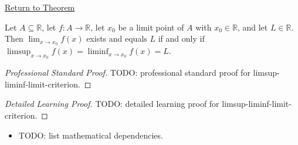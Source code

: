 \newpage
{}
\label{prf:limsup-liminf-limit-criterion}

\begin{remark*}[Return]
\hyperref[prop:limsup-liminf-limit-criterion]{Return to Theorem}
\end{remark*}

\begin{theorem*}[Limit Exists iff $=$]
Let $A \subseteq \mathbb{R}$, let $f \colon A \to \mathbb{R}$, let $x_0$ be a limit point of $A$ with $x_0 \in \mathbb{R}$, and let $L \in \mathbb{R}$. Then $\lim_{x \to x_0} f(x)$ exists and equals $L$ if and only if $\limsup_{x \to x_0} f(x) = \liminf_{x \to x_0} f(x) = L$.
\end{theorem*}

\begin{proof}[Professional Standard Proof]
\LRAProofBodyStart
TODO: professional standard proof for limsup-liminf-limit-criterion.
\end{proof}

\begin{proof}[Detailed Learning Proof]
\LRAProofBodyStart
TODO: detailed learning proof for limsup-liminf-limit-criterion.
\end{proof}

\begin{remark*}
\end{remark*}

\begin{dependencies}
\begin{itemize}
  \item TODO: list mathematical dependencies.
\end{itemize}
\end{dependencies}

\clearpage
